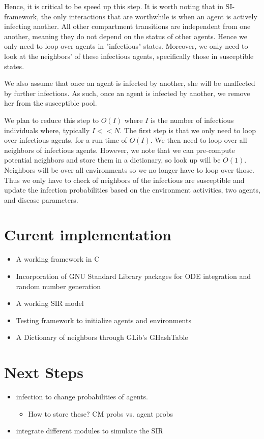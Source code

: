 \documentclass{article}
\begin{document}
Hence, it is critical to be speed up this step.  It is worth noting that in SI-framework, the only interactions that are worthwhile is when an agent is actively infecting another.  All other compartment transitions are independent from one another, meaning they do not depend on the status of other agents.  Hence we only need to loop over agents in "infectious" states.  Moreover, we only need to look at the neighbors' of these infectious agents, specifically those in susceptible states.

We also assume that once an agent is infected by another, she will be unaffected by further infections.  As such, once an agent is infected by another, we remove her from the susceptible pool.

We plan to reduce this step to $O(I)$ where $I$ is the number of infectious individuals where, typically $I << N$.  The first step is that we only need to loop over infectious agents, for a run time of $O(I)$.  We then need to loop over all neighbors of infectious agents.  However, we note that we can pre-compute potential neighbors and store them in a dictionary, so look up will be $O(1)$.  Neighbors will be over all environments so we no longer have to loop over those.  Thus we only have to check of neighbors of the infectious are susceptible and update the infection probabilities based on the environment activities, two agents, and disease parameters.



\section{Curent implementation}
\label{sec-3}
\begin{itemize}
\item A working framework in C
\item Incorporation of GNU Standard Library packages for ODE integration and random number generation
\item A working SIR model
\item Testing framework to initialize agents and environments
\item A Dictionary of neighbors through GLib's GHashTable
\end{itemize}

\section{Next Steps}
\label{sec-4}
\begin{itemize}
\item infection to change probabilities of agents.
\begin{itemize}
\item How to store these? CM probs vs. agent probs
\end{itemize}
\item integrate different modules to simulate the SIR
\end{itemize}
\end{document}
